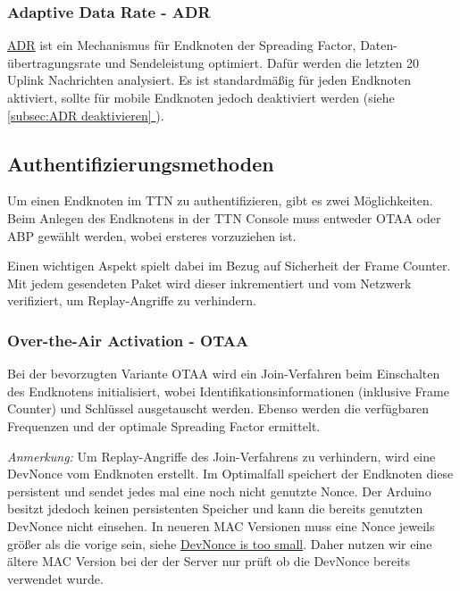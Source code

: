 \documentclass[12pt]{article}
\newcommand*{\fullref}[1]{\hyperref[{#1}]{\ref{#1} \nameref{#1}}}   %
\begin{document}
      \subsubsection{Adaptive Data Rate - ADR}   
        \href{https://www.thethingsnetwork.org/docs/lorawan/adaptive-data-rate/}{ADR} ist ein Mechanismus für Endknoten
        der Spreading Factor, Daten-\\übertragungsrate und Sendeleistung optimiert. Dafür werden die letzten 20 Uplink Nachrichten analysiert.
        Es ist standardmäßig für jeden Endknoten aktiviert, sollte für mobile Endknoten jedoch deaktiviert werden (siehe\\\underline{\fullref{subsec:ADR deaktivieren}}).



    \subsection{Authentifizierungsmethoden} \label{subsec:Authentifizierungsmethoden}
      Um einen Endknoten im TTN zu authentifizieren, gibt es zwei Möglichkeiten. Beim Anlegen des Endknotens in der TTN Console muss entweder
      OTAA oder ABP gewählt werden, wobei ersteres vorzuziehen ist.

      Einen wichtigen Aspekt spielt dabei im Bezug auf Sicherheit der Frame Counter. Mit jedem gesendeten Paket wird dieser inkrementiert
      und vom Netzwerk verifiziert, um Replay-Angriffe zu verhindern.



      \subsubsection{Over-the-Air Activation - OTAA}
        Bei der bevorzugten Variante OTAA wird ein Join-Verfahren beim Einschalten des Endknotens initialisiert,
        wobei Identifikationsinformationen (inklusive Frame Counter) und Schlüssel ausgetauscht werden. Ebenso werden die verfügbaren Frequenzen und
        der optimale Spreading Factor ermittelt.

        \textit{Anmerkung:} Um Replay-Angriffe des Join-Verfahrens zu verhindern, wird eine DevNonce vom Endknoten erstellt.
        Im Optimalfall speichert der Endknoten diese persistent und sendet jedes mal eine noch nicht genutzte Nonce. Der Arduino besitzt jdedoch keinen persistenten Speicher und kann die
        bereits genutzten DevNonce nicht einsehen. In neueren MAC Versionen muss eine Nonce jeweils größer als die
        vorige sein, siehe \href{https://www.thethingsnetwork.org/forum/t/devnonce-is-too-small-what-to-do/46330}{DevNonce is too small}.
        Daher nutzen wir eine ältere MAC Version bei der der Server nur prüft ob die DevNonce bereits verwendet wurde.
\end{document}
